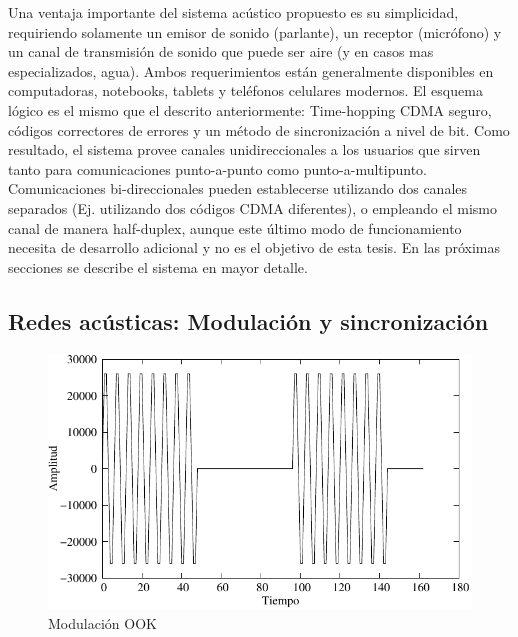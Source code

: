 Una ventaja importante del sistema acústico propuesto es su simplicidad, requiriendo solamente un emisor de sonido (parlante), un receptor (micrófono) y un canal de transmisión de sonido que puede ser aire (y en casos mas especializados, agua). Ambos requerimientos están generalmente disponibles en computadoras, notebooks, tablets y teléfonos celulares modernos. 
El esquema lógico es el mismo que el descrito anteriormente: Time-hopping CDMA seguro, códigos correctores de errores y un método de sincronización a nivel de bit.
Como resultado, el sistema provee canales unidireccionales a los usuarios que sirven tanto para comunicaciones punto-a-punto como punto-a-multipunto. Comunicaciones bi-direccionales pueden establecerse utilizando dos canales separados (Ej. utilizando dos códigos CDMA diferentes), o empleando el mismo canal de manera half-duplex, aunque este último modo de funcionamiento necesita de desarrollo adicional y no es el objetivo de esta tesis.
En las próximas secciones se describe el sistema en mayor detalle.

\subsection{Redes acústicas: Modulación y sincronización}
\begin{figure}[t]
  \centering
    \includegraphics[width=4.5in]{graphs/modulated.pdf}
    \caption{Modulación OOK}
    \label{arch:sync}
\end{figure}



